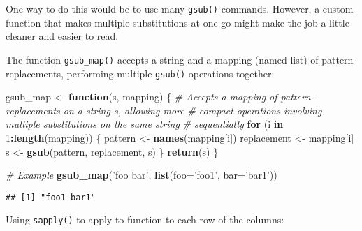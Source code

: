 \documentclass[11pt,]{article}
\newenvironment{Shaded}{\begin{snugshade}}{\end{snugshade}}
\newcommand{\CommentTok}[1]{\textcolor[rgb]{0.56,0.35,0.01}{\textit{#1}}}
\newcommand{\ControlFlowTok}[1]{\textcolor[rgb]{0.13,0.29,0.53}{\textbf{#1}}}
\newcommand{\DataTypeTok}[1]{\textcolor[rgb]{0.13,0.29,0.53}{#1}}
\newcommand{\DecValTok}[1]{\textcolor[rgb]{0.00,0.00,0.81}{#1}}
\newcommand{\KeywordTok}[1]{\textcolor[rgb]{0.13,0.29,0.53}{\textbf{#1}}}
\newcommand{\NormalTok}[1]{#1}
\newcommand{\OperatorTok}[1]{\textcolor[rgb]{0.81,0.36,0.00}{\textbf{#1}}}
\newcommand{\StringTok}[1]{\textcolor[rgb]{0.31,0.60,0.02}{#1}}
\begin{document}
One way to do this would be to use many \texttt{gsub()} commands.
However, a custom function that makes multiple substitutions at one go
might make the job a little cleaner and easier to read.

The function \texttt{gsub\_map()} accepts a string and a mapping (named
list) of pattern-replacements, performing multiple \texttt{gsub()}
operations together:

\begin{Shaded}
\begin{Highlighting}[]
\NormalTok{gsub_map <-}\StringTok{ }\ControlFlowTok{function}\NormalTok{(s, mapping) \{}
    \CommentTok{# Accepts a mapping of pattern-replacements on a string s, allowing more }
    \CommentTok{# compact operations involving mutliple substitutions on the same string}
    \CommentTok{# sequentially}
    \ControlFlowTok{for}\NormalTok{ (i }\ControlFlowTok{in} \DecValTok{1}\OperatorTok{:}\KeywordTok{length}\NormalTok{(mapping)) \{}
\NormalTok{        pattern <-}\StringTok{ }\KeywordTok{names}\NormalTok{(mapping[i])}
\NormalTok{        replacement <-}\StringTok{ }\NormalTok{mapping[i]}
\NormalTok{        s <-}\StringTok{ }\KeywordTok{gsub}\NormalTok{(pattern, replacement, s)}
\NormalTok{    \}}
    \KeywordTok{return}\NormalTok{(s)}
\NormalTok{\}}

\CommentTok{# Example}
\KeywordTok{gsub_map}\NormalTok{(}\StringTok{'foo bar'}\NormalTok{, }\KeywordTok{list}\NormalTok{(}\DataTypeTok{foo=}\StringTok{'foo1'}\NormalTok{, }\DataTypeTok{bar=}\StringTok{'bar1'}\NormalTok{))}
\end{Highlighting}
\end{Shaded}

\begin{verbatim}
## [1] "foo1 bar1"
\end{verbatim}

Using \texttt{sapply()} to apply to function to each row of the columns:
\end{document}
